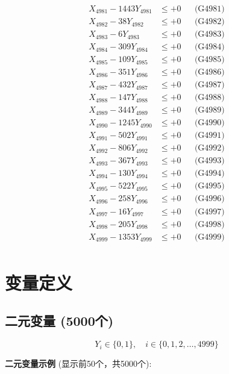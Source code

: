 \documentclass[a4paper,10pt]{article}
\begin{document}
{\begin{align}
\allowbreak
X_{4981} - 1443Y_{4981} &\leq +0 && \text{(G4981)} \\
X_{4982} - 38Y_{4982} &\leq +0 && \text{(G4982)} \\
X_{4983} - 6Y_{4983} &\leq +0 && \text{(G4983)} \\
X_{4984} - 309Y_{4984} &\leq +0 && \text{(G4984)} \\
X_{4985} - 109Y_{4985} &\leq +0 && \text{(G4985)} \\
X_{4986} - 351Y_{4986} &\leq +0 && \text{(G4986)} \\
X_{4987} - 432Y_{4987} &\leq +0 && \text{(G4987)} \\
X_{4988} - 147Y_{4988} &\leq +0 && \text{(G4988)} \\
X_{4989} - 344Y_{4989} &\leq +0 && \text{(G4989)} \\
X_{4990} - 1245Y_{4990} &\leq +0 && \text{(G4990)} \\
\allowbreak
X_{4991} - 502Y_{4991} &\leq +0 && \text{(G4991)} \\
X_{4992} - 806Y_{4992} &\leq +0 && \text{(G4992)} \\
X_{4993} - 367Y_{4993} &\leq +0 && \text{(G4993)} \\
X_{4994} - 130Y_{4994} &\leq +0 && \text{(G4994)} \\
X_{4995} - 522Y_{4995} &\leq +0 && \text{(G4995)} \\
X_{4996} - 258Y_{4996} &\leq +0 && \text{(G4996)} \\
X_{4997} - 16Y_{4997} &\leq +0 && \text{(G4997)} \\
X_{4998} - 205Y_{4998} &\leq +0 && \text{(G4998)} \\
X_{4999} - 1353Y_{4999} &\leq +0 && \text{(G4999)} \\
\end{align}
}

\section{变量定义}

\subsection{二元变量 (5000个)}

\begin{equation}
Y_i \in \{0,1\}, \quad i \in \{0, 1, 2, \ldots, 4999\}
\end{equation}

\textbf{二元变量示例} (显示前50个，共5000个):
\end{document}
